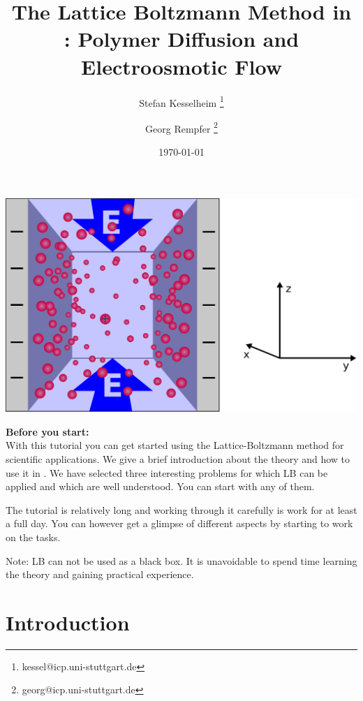 \renewcommand{\d}{\mathrm d}
\subject{ESPResSo Tutorial}
\title{The Lattice Boltzmann Method in \ES{}: 
Polymer Diffusion and Electroosmotic Flow
} \author{ Stefan Kesselheim \thanks{\ttfamily 
kessel@icp.uni-stuttgart.de}  \and  Georg Rempfer \thanks{\ttfamily 
georg@icp.uni-stuttgart.de}}
\date{\today}
\publishers{Institute for Computational Physics, Stuttgart University}
\maketitle 
\begin{center}
  \includegraphics[width=0.5\columnwidth]{figures/schlitzpore_3d.pdf}
\end{center}
\pagebreak
{}
\begin{center}
  \colorbox{mygray}{ 
\begin{minipage}[h]{13cm}
  {\bf \large Before you start:}\\
  With this tutorial you can get started using the Lattice-Boltzmann method
  for scientific applications. We give a brief introduction about the theory
  and how to use it in \ES{}. 
  We have selected three interesting problems for which LB can be applied
  and which are well understood.  You can start with any of them.
   

  The tutorial is relatively long and working through it carefully
  is work for at least a full day. You can however get a glimpse 
  of different aspects by starting to work on the tasks.


  Note: LB can not be used as a black box. It is unavoidable 
  to spend time learning the theory and gaining practical experience. 
\end{minipage}
}
\end{center}

 \tableofcontents
 \pagebreak
  
\section{Introduction}




